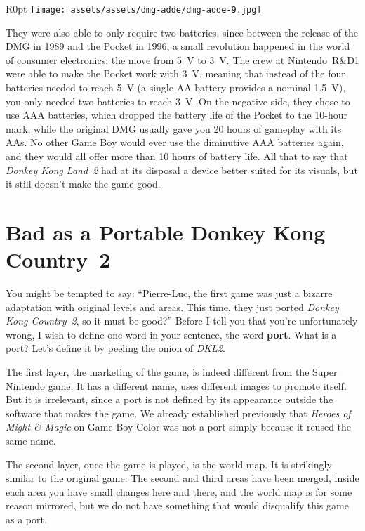 \documentclass{book}
\begin{document}
\begin{wrapfigure}{R}{0pt} \texttt{[image: assets/assets/dmg-adde/dmg-adde-9.jpg]}\end{wrapfigure}
They were also able to only require two batteries, since between the release of the DMG in 1989 and the Pocket in 1996, a small revolution happened in the world of consumer electronics: the move from 5 V to 3 V. The crew at Nintendo R\&D1 were able to make the Pocket work with 3 V, meaning that instead of the four batteries needed to reach 5 V (a single AA battery provides a nominal 1.5 V), you only needed two batteries to reach 3 V. On the negative side, they chose to use AAA batteries, which dropped the battery life of the Pocket to the 10-hour mark, while the original DMG usually gave you 20 hours of gameplay with its AAs. No other Game Boy would ever use the diminutive AAA batteries again, and they would all offer more than 10 hours of battery life. All that to say that \emph{Donkey Kong Land 2} had at its disposal a device better suited for its visuals, but it still doesn’t make the game good.

\FloatBarrier\needspace{5pt}\section*{Bad as a Portable Donkey Kong Country 2}\nopagebreak[4]

You might be tempted to say: “Pierre-Luc, the first game was just a bizarre adaptation with original levels and areas. This time, they just ported \emph{Donkey Kong Country 2}, so it must be good?” Before I tell you that you’re unfortunately wrong, I wish to define one word in your sentence, the word \textbf{port}. What is a port? Let’s define it by peeling the onion of \emph{DKL2}.

The first layer, the marketing of the game, is indeed different from the Super Nintendo game. It has a different name, uses different images to promote itself. But it is irrelevant, since a port is not defined by its appearance outside the software that makes the game. We already established previously that \emph{Heroes of Might \& Magic} on Game Boy Color was not a port simply because it reused the same name.

The second layer, once the game is played, is the world map. It is strikingly similar to the original game. The second and third areas have been merged, inside each area you have small changes here and there, and the world map is for some reason mirrored, but we do not have something that would disqualify this game as a port.
\end{document}
